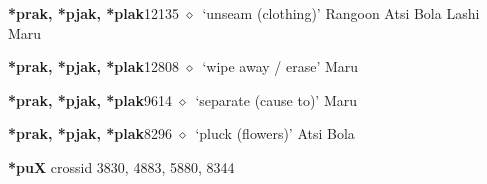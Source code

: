   \begin{list}{}{\leftmargin=1.5em \itemindent=-1.5em}
  \item {\footnotesize \textbf{*prak, *pjak, *plak}}{\tiny 12135}
         $\diamond$~`unseam (clothing)'
         Rangoon 
\hspace{1ex}
         Atsi 
\hspace{1ex}
         Bola 
\hspace{1ex}
         Lashi 
\hspace{1ex}
         Maru 
  \item {\footnotesize \textbf{*prak, *pjak, *plak}}{\tiny 12808}
\hspace{1ex}
         $\diamond$~`wipe away / erase'
         Maru 
  \item {\footnotesize \textbf{*prak, *pjak, *plak}}{\tiny 9614}
\hspace{1ex}
         $\diamond$~`separate (cause to)'
         Maru 
  \item {\footnotesize \textbf{*prak, *pjak, *plak}}{\tiny 8296}
\hspace{1ex}
         $\diamond$~`pluck (flowers)'
         Atsi 
\hspace{1ex}
         Bola 
  \end{list}
\item
\textbf{*puX}
  {\tiny crossid 3830, 4883, 5880, 8344}
